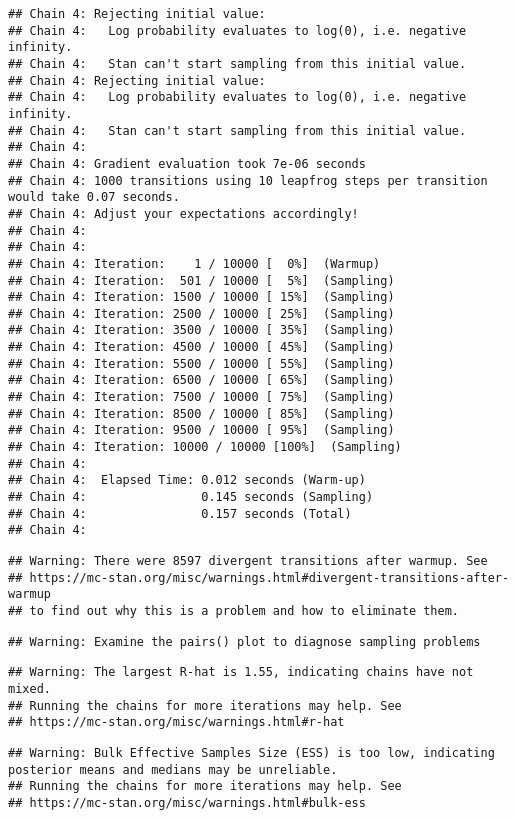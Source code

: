 \documentclass[
]{article}
\begin{document}
\begin{verbatim}
## Chain 4: Rejecting initial value:
## Chain 4:   Log probability evaluates to log(0), i.e. negative infinity.
## Chain 4:   Stan can't start sampling from this initial value.
## Chain 4: Rejecting initial value:
## Chain 4:   Log probability evaluates to log(0), i.e. negative infinity.
## Chain 4:   Stan can't start sampling from this initial value.
## Chain 4: 
## Chain 4: Gradient evaluation took 7e-06 seconds
## Chain 4: 1000 transitions using 10 leapfrog steps per transition would take 0.07 seconds.
## Chain 4: Adjust your expectations accordingly!
## Chain 4: 
## Chain 4: 
## Chain 4: Iteration:    1 / 10000 [  0%]  (Warmup)
## Chain 4: Iteration:  501 / 10000 [  5%]  (Sampling)
## Chain 4: Iteration: 1500 / 10000 [ 15%]  (Sampling)
## Chain 4: Iteration: 2500 / 10000 [ 25%]  (Sampling)
## Chain 4: Iteration: 3500 / 10000 [ 35%]  (Sampling)
## Chain 4: Iteration: 4500 / 10000 [ 45%]  (Sampling)
## Chain 4: Iteration: 5500 / 10000 [ 55%]  (Sampling)
## Chain 4: Iteration: 6500 / 10000 [ 65%]  (Sampling)
## Chain 4: Iteration: 7500 / 10000 [ 75%]  (Sampling)
## Chain 4: Iteration: 8500 / 10000 [ 85%]  (Sampling)
## Chain 4: Iteration: 9500 / 10000 [ 95%]  (Sampling)
## Chain 4: Iteration: 10000 / 10000 [100%]  (Sampling)
## Chain 4: 
## Chain 4:  Elapsed Time: 0.012 seconds (Warm-up)
## Chain 4:                0.145 seconds (Sampling)
## Chain 4:                0.157 seconds (Total)
## Chain 4:
\end{verbatim}

\begin{verbatim}
## Warning: There were 8597 divergent transitions after warmup. See
## https://mc-stan.org/misc/warnings.html#divergent-transitions-after-warmup
## to find out why this is a problem and how to eliminate them.
\end{verbatim}

\begin{verbatim}
## Warning: Examine the pairs() plot to diagnose sampling problems
\end{verbatim}

\begin{verbatim}
## Warning: The largest R-hat is 1.55, indicating chains have not mixed.
## Running the chains for more iterations may help. See
## https://mc-stan.org/misc/warnings.html#r-hat
\end{verbatim}

\begin{verbatim}
## Warning: Bulk Effective Samples Size (ESS) is too low, indicating posterior means and medians may be unreliable.
## Running the chains for more iterations may help. See
## https://mc-stan.org/misc/warnings.html#bulk-ess
\end{verbatim}
\end{document}
